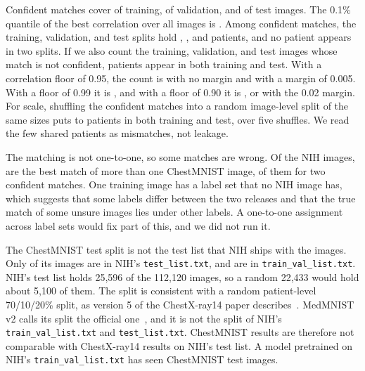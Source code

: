 \documentclass[conference]{IEEEtran}
\newif\ifanycitation
\let\citeAnyKey\cite
\renewcommand{\cite}{\global\anycitationtrue\citeAnyKey}
\begin{document}
Confident matches cover \confidentTrain{} of \rowsTrain{} training, \confidentVal{} of
\rowsVal{} validation, and \confidentTest{} of \rowsTest{} test images. The 0.1\%
quantile of the best correlation over all images is \corrQuantileOne{}. Among confident
matches, the training, validation, and test splits hold \patientsTrain{},
\patientsVal{}, and \patientsTest{} patients, and no patient appears in two splits. If we
also count the \unmatchedTrain{} training,
\unmatchedVal{} validation, and \unmatchedTest{} test images whose match is not
confident, \looseSharedTrainTest{} patients appear in both training and test. With a
correlation floor of 0.95, the count is \sharedRuleNoMargin{} with no margin and
\sharedRuleSmallMargin{} with a margin of 0.005. With a floor of 0.99 it is
\sharedRuleHighFloor{}, and with a floor of 0.90 it is \sharedRuleLowFloor{}, or
\sharedRuleLowFloorMargin{} with the 0.02 margin. For scale, shuffling the confident
matches into a random image-level split of the same sizes puts \nullSharedMin{} to
\nullSharedMax{} patients in both training and test, over five shuffles. We read the few
shared patients as mismatches, not leakage.

The matching is not one-to-one, so some matches are wrong. Of the NIH images, \nihClaimedTwice{}
are the best match of more than one ChestMNIST image, \nihClaimedTwiceSure{} of them for
two confident matches. One training image has a label set that no NIH image
has, which suggests that some labels differ between the two releases and that the true
match of some unsure images lies under other labels. A one-to-one assignment across label
sets would fix part of this, and we did not run it.

The ChestMNIST test split is not the test list that NIH ships with the images. Only
\testFromNihTest{} of its \rowsTest{} images are in NIH's \texttt{test\_list.txt}, and
\testFromNihTrain{} are in \texttt{train\_val\_list.txt}. NIH's test list holds 25,596 of the 112,120 images, so a random 22,433 would hold
about 5,100 of them. The split is consistent with a random
patient-level 70/10/20\% split, as version 5 of the ChestX-ray14 paper
describes~\cite{wang2017chestxray8}. MedMNIST v2 calls its split the official one~\cite{yang2023medmnist}, and it
is not the split of NIH's \texttt{train\_val\_list.txt} and \texttt{test\_list.txt}. ChestMNIST results are therefore not comparable
with ChestX-ray14 results on NIH's test list. A model pretrained on NIH's
\texttt{train\_val\_list.txt} has seen \testFromNihTrain{} ChestMNIST test images.
\end{document}
